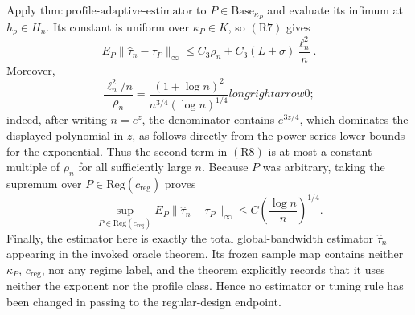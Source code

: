 Apply \(\mathrm{thm{:}profile\text{-}adaptive\text{-}estimator}\) to
\(P\in\mathrm{Base}_{\kappa_P}\) and evaluate its infimum at
\(h_{\rho}\in H_n\).  Its constant is uniform over
\(\kappa_P\in K\), so \((\mathrm{R7})\) gives
\[
 E_P\|\widehat\tau_n-\tau_P\|_\infty
 \leq C_3\rho_n+C_3(L+\sigma)\frac{\ell_n^2}{n}. \tag{R8}
\]
Moreover,
\[
 \frac{\ell_n^2/n}{\rho_n}
 =\frac{(1+\log n)^2}{n^{3/4}(\log n)^{1/4}}longrightarrow0; \tag{R9}
\]
indeed, after writing \(n=e^z\), the denominator contains
\(e^{3z/4}\), which dominates the displayed polynomial in \(z\), as
follows directly from the power-series lower bounds for the exponential.
Thus the second term in \((\mathrm{R8})\) is at most a constant multiple of
\(\rho_n\) for all sufficiently large \(n\).  Because \(P\) was arbitrary,
taking the supremum over \(P\in\mathrm{Reg}(c_{\mathrm{reg}})\) proves
\[
 \sup_{P\in\mathrm{Reg}(c_{\mathrm{reg}})}
 E_P\|\widehat\tau_n-\tau_P\|_\infty
 \leq C\left(\frac{\log n}{n}\right)^{1/4}.
\]
Finally, the estimator here is exactly the total global-bandwidth estimator
\(\widehat\tau_n\) appearing in the invoked oracle theorem.  Its frozen
sample map contains neither \(\kappa_P\), \(c_{\mathrm{reg}}\), nor any
regime label, and the theorem explicitly records that it uses neither the
exponent nor the profile class.  Hence no estimator or tuning rule has been
changed in passing to the regular-design endpoint.
